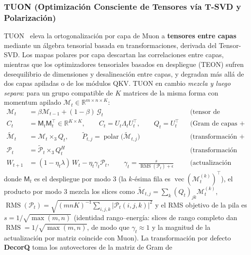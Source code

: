 \subsubsection{TUON (Optimización Consciente de Tensores vía T-SVD y Polarización)}
TUON~\citep{tang_tuon_2026} eleva la ortogonalización por capa de Muon a
\textbf{tensores entre capas} mediante un álgebra tensorial basada en transformaciones,
derivada del Tensor-SVD. Los mapas polares por capa descartan las correlaciones entre
capas, mientras que los optimizadores tensoriales basados en despliegue (TEON) sufren
desequilibrio de dimensiones y desalineación entre capas, y degradan más allá de dos
capas apiladas o de los módulos QKV. TUON en cambio \emph{mezcla y luego separa}: para
un grupo compatible de $K$ matrices de la misma forma con momentum apilado
$\mathcal{M}_t \in \mathbb{R}^{m \times n \times K}$:
\begin{align}
\mathcal{M}_t &= \beta \mathcal{M}_{t-1} + (1-\beta)\, \mathcal{G}_t
  && \text{(tensor de momentum, Alg.~1 línea 2)} \\
C_t &= \mathsf{M}_t \mathsf{M}_t^{\top} \in \mathbb{R}^{K \times K}, \qquad
C_t = U_t \Lambda_t U_t^{\top}, \qquad Q_t = U_t^{\top}
  && \text{(Gram de capas + autodescomposición, líneas 3--5)} \\
\widetilde{\mathcal{M}}_t &= \mathcal{M}_t \times_3 Q_t, \qquad
\widetilde{P}_{t,j} = \operatorname{polar}\!\big(\widetilde{\mathcal{M}}_{t,j}\big)
  && \text{(transformación + polarización por slice, líneas 6--9)} \\
\mathcal{P}_t &= \widetilde{\mathcal{P}}_t \times_3 Q_t^{H}
  && \text{(transformación inversa, línea 10)} \\
W_{t+1} &= (1 - \eta_t \lambda)\, W_t - \eta_t \gamma_t \mathcal{P}_t, \qquad
\gamma_t = \frac{s}{\operatorname{RMS}(\mathcal{P}_t) + \epsilon}
  && \text{(actualización escalada por RMS, línea 11)}
\end{align}
donde $\mathsf{M}_t$ es el despliegue por modo 3 (la $k$-ésima fila es
$\operatorname{vec}(\mathcal{M}_t^{(k)})^{\top}$), el producto por modo 3 mezcla los
slices como $\widetilde{\mathcal{M}}_{t,j} = \sum_k (Q_t)_{jk} \mathcal{M}_t^{(k)}$,
$\operatorname{RMS}(\mathcal{P}_t) = \sqrt{(mnK)^{-1} \sum_{i,j,k} |\mathcal{P}_t(i,j,k)|^2}$
y el RMS objetivo de la pila es $s = 1/\sqrt{\max(m,n)}$ (identidad rango--energía: slices
de rango completo dan $\operatorname{RMS} = 1/\sqrt{\max(m,n)}$, de modo que $\gamma_t
\approx 1$ y la magnitud de la actualización por matriz coincide con Muon). La
transformación por defecto \textbf{DecorQ} toma los autovectores de la matriz de Gram de
